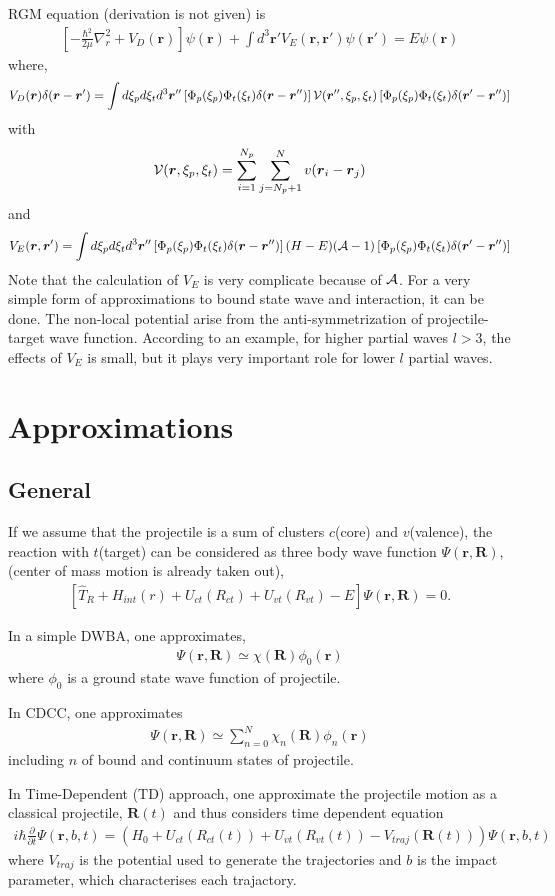 \documentclass[11pt]{book}
\def\bm{\boldsymbol}
\def\vr{{\bm r}}
\def\vR{{\bm R}}
\newcommand{\bea}{\begin{eqnarray}}
\newcommand{\eea}{\end{eqnarray}}
\newcommand{\del}{\partial}
\begin{document}
RGM equation (derivation is not given) is
\bea 
\left[-\frac{\hbar^2}{2\mu}\nabla_r^2+V_D(\vr) \right] \psi(\vr)
+\int d^3\vr' V_E(\vr,\vr') \psi(\vr') = E\psi(\vr)
\eea 
where,
\bea 
V_D(\vr)\delta(\vr-\vr')
=\int d\xi_p d\xi_t d^3\vr'' 
       \left[ \Phi_p(\xi_p)\Phi_t(\xi_t) \delta(\vr-\vr'')\right ] 
       {\cal V}(\vr'',\xi_p,\xi_t)
       \left[ \Phi_p(\xi_p)\Phi_t(\xi_t) \delta(\vr'-\vr'')\right ] 
\eea 
with
\bea 
{\cal V}(\vr,\xi_p,\xi_t)
=\sum_{i=1}^{N_p}\sum_{j=N_p+1}^{N} v(\vr_i-\vr_j)
\eea 
and 
\bea 
V_E(\vr,\vr')=\int d\xi_p d\xi_t d^3\vr''
    \left[ \Phi_p(\xi_p)\Phi_t(\xi_t) \delta(\vr-\vr'')\right ] 
    (H-E)({\cal A}-1)\left[ \Phi_p(\xi_p)\Phi_t(\xi_t) \delta(\vr'-\vr'')\right ] 
\eea 
Note that the calculation of $V_E$ is very complicate because of ${\cal A}$. 
For a very simple form of approximations to bound state wave and interaction, 
it can be done. The non-local potential arise from the anti-symmetrization of 
projectile-target wave function. 
According to an example, for higher partial waves $l>3$, the effects of $V_E$
is small, but it plays very important role for lower $l$ partial waves. 


\chapter{Approximations} 


\section{General} 
If we assume that the projectile is a sum of clusters $c$(core) and $v$(valence),
the reaction with $t$(target) can be considered as three body wave function $\Psi(\vr,\vR)$,
(center of mass motion is already taken out),
\bea 
\boxed{ 
	[\hat{T}_R+H_{int}(r)+U_{ct}(R_{ct})+U_{vt}(R_{vt})-E]\Psi(\vr,\vR)=0.
}
\eea 

In a simple DWBA, one approximates, 
\bea 
\Psi(\vr,\vR)\simeq \chi(\vR)\phi_0(\vr) 
\eea 
where $\phi_0$ is a ground state wave function of projectile.

In CDCC, one approximates
\bea 
\Psi(\vr,\vR)\simeq \sum_{n=0}^N \chi_n(\vR)\phi_n(\vr) 
\eea  
including $n$ of bound and continuum states of projectile. 

In Time-Dependent (TD) approach, one approximate the projectile motion as a
classical projectile, $\vR(t)$ and thus considers
time dependent equation
\bea 
i\hbar\frac{\del}{\del t}\Psi(\vr,b,t) = (H_0+U_{ct}(R_{ct}(t)) +U_{vt}(R_{vt}(t))-V_{traj}(\vR(t)) )\Psi(\vr,b,t)
\eea 
where $ V_{traj}$ is the potential used to generate the trajectories and $b$ is the impact parameter,
which characterises each trajactory. 
\end{document}
